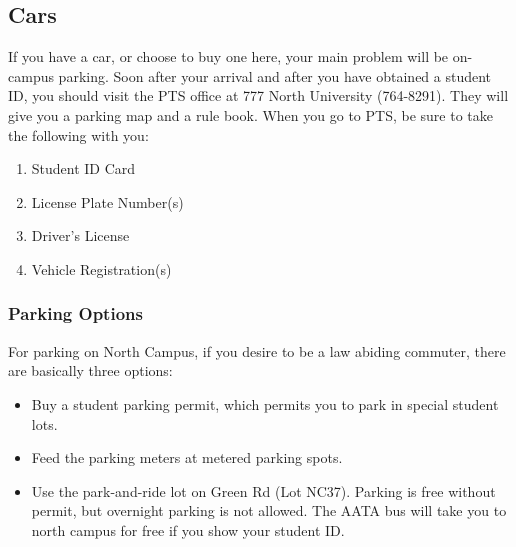 \documentclass[11pt]{article}
\begin{document}
\subsection{Cars}
\label{sec-11_4}

If you have a car, or choose to buy one here, your main problem will be on-campus parking.  Soon after your arrival and after you have obtained a student ID, you should visit the PTS office at 777 North University (764-8291).  They will give you a parking map and a rule book.  When you go to PTS, be sure to take the following with you:

\begin{enumerate}
\item Student ID Card
\item License Plate Number(s)
\item Driver's License
\item Vehicle Registration(s)
\end{enumerate}
\subsubsection{Parking Options}
\label{sec-11_4_1}

For parking on North Campus, if you desire to be a law abiding
commuter, there are basically three options:

\begin{itemize}
\item Buy a student parking permit, which permits you to park in special student lots.
\item Feed the parking meters at metered parking spots.
\item Use the park-and-ride lot on Green Rd (Lot NC37).  Parking is free without permit, but overnight parking is not allowed.  The AATA bus will take you to north campus for free if you show your student ID.
\end{itemize}
\end{document}
